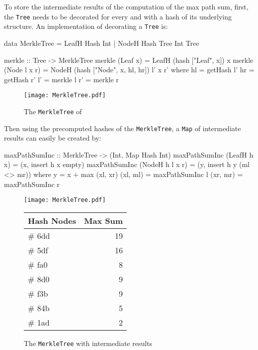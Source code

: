 To store the intermediate results of the computation of the max path sum, first, the \texttt{Tree} needs to be decorated for every  and  with a hash of its underlying structure. An implementation of decorating a \texttt{Tree} is:

\begin{haskell}
data MerkleTree = LeafH Hash Int
                | NodeH Hash Tree Int Tree

merkle :: Tree -> MerkleTree
merkle (Leaf x)     = LeafH (hash ["Leaf", x]) x
merkle (Node l x r) = NodeH (hash ["Node", x, hl, hr]) l' x r'
  where
    hl = getHash l'
    hr = getHash r'
    l' = merkle l
    r' = merkle r
\end{haskell}

\begin{figure}[H]
    \centering
    \texttt{[image: MerkleTree.pdf]}
    \caption{The \texttt{MerkleTree} of }
\end{figure}

Then using the precomputed hashes of the \texttt{MerkleTree}, a \texttt{Map} of intermediate results can easily be created by:

\begin{haskell}
maxPathSumInc :: MerkleTree -> (Int, Map Hash Int)    
maxPathSumInc (LeafH h x)     = (x, insert h x empty)
maxPathSumInc (NodeH h l x r) = (y, insert h y (ml <> mr))  
  where
    y = x + max (xl, xr)
    (xl, ml) = maxPathSumInc l
    (xr, mr) = maxPathSumInc r
\end{haskell}
\vspace{15pt}
\begin{figure}[H]
    \begin{minipage}[c]{0.55\textwidth}
        \centering
        \texttt{[image: MerkleTree.pdf]}
    \end{minipage}
    \hspace{0.1\textwidth}
    \begin{minipage}[c]{0.35\textwidth}
        \centering
        \begin{tabular}{|l|r|}
            \hline
            \textbf{Hash Nodes} & \textbf{Max Sum} \\
            \hline
            \# 6dd & 19 \\
            \hline
            \# 5df & 16 \\
            \hline
            \# fa0 & 8 \\
            \hline
            \# 8d0 & 9 \\
            \hline
            \# f3b & 9 \\
            \hline
            \# 84b & 5 \\
            \hline
            \# 1ad & 2 \\
            \hline
        \end{tabular}
    \end{minipage}
    \caption{The \texttt{MerkleTree} with intermediate results}    
\end{figure}


